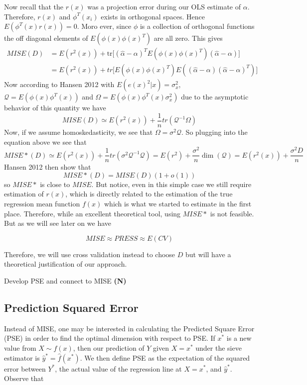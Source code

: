 \documentclass[12pt]{article}  %
\begin{document}
Now recall that the $r(x)$ was a projection error during our OLS estimate of $\alpha$. Therefore, $r(x)$ and $\phi^{T}(x_i)$ exists in orthogonal spaces. Hence $E(\phi^{T}(x)r(x)) = 0$. Moro ever, since $\phi$ is a collection of orthogonal functions the off diagonal elements of $E(\phi(x)\phi(x)^T)$ are all zero. This gives 
\begin{align*}
MISE(D) &= E(r^{2}(x)) + \text{tr}\Big[(\hat{\alpha} - \alpha)^TE(\phi(x)\phi(x)^T)(\hat{\alpha} - \alpha)\Big]\\
&= E(r^{2}(x)) + tr\Big[E(\phi(x)\phi(x)^{T})E\left((\hat{\alpha} - \alpha)(\hat{\alpha} - \alpha)^{T}\right)\Big]
\end{align*}
Now according to Hansen 2012 with $E(e(x)^2|x) = \sigma_x^2$, $\mathcal{Q} = E(\phi(x)\phi^T(x))$ and $\Omega = E(\phi(x)\phi^T(x)\sigma_x^2)$ due to the asymptotic behavior of this quantity we have 
$$MISE(D)\simeq E(r^2(x)) + \frac{1}{n}tr\left(\mathcal{Q}^{-1}\Omega\right)$$
Now, if we assume homoskedasticity, we see that $\Omega = \sigma^2\mathcal{Q}$. So plugging into the equation above we see that 
$$MISE*(D)\simeq E(r^2(x)) + \frac{1}{n}tr\left(\sigma^2\mathcal{Q}^{-1}\mathcal{Q}\right) = E(r^2) + \frac{\sigma^2}{n}\dim(\mathcal{Q}) = E(r^2(x)) + \frac{\sigma^2 D}{n}$$
Hansen 2012 then show that $$MISE*(D) = MISE(D)(1 + o(1))$$ so $MISE*$ is close to $MISE$. But notice, even in this simple case we still require estimation of $r(x)$, which is directly related to the estimation of the true regression mean function $f(x)$ which is what we started to estimate in the first place. Therefore, while an excellent theoretical tool, using $MISE*$ is not feasible. But as we will see later on we have 

$$MISE \approx PRESS \approx E(CV)$$

Therefore, we will use cross validation instead to choose $D$ but will have a theoretical justification of our approach. 
\item Develop PSE and connect to MISE \textbf{(N)}
\subsection{Prediction Squared Error}

Instead of MISE, one may be interested in calculating the Predicted Square Error (PSE) in order to find the optimal dimension with respect to PSE. If $x^*$  is a new value from $X \sim f(x)$, then our prediction of $Y$ given $X = x^*$ under the sieve estimator is $\hat{y}^* = \hat{f}(x^*)$. We then define PSE as the expectation of the squared error between $Y^*$, the actual value of the regression line at $X=x^*$, and $\hat{y}^*$. Observe that
\end{document}
